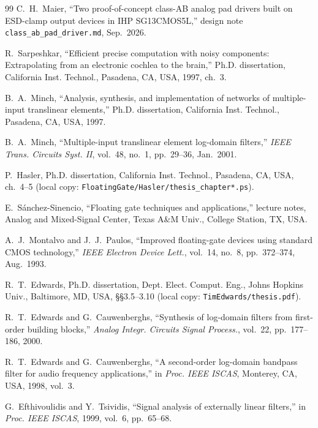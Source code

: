 \documentclass[journal]{IEEEtran}
\newcommand{\cell}[1]{\texttt{#1}}
\begin{document}
\begin{thebibliography}{99}
C.~H.~Maier, ``Two proof-of-concept class-AB analog pad drivers built on ESD-clamp output
devices in IHP SG13CMOS5L,'' design note \cell{class\_ab\_pad\_driver.md}, Sep.~2026.

R.~Sarpeshkar, ``Efficient precise computation with noisy components: Extrapolating from an
electronic cochlea to the brain,'' Ph.D. dissertation, California Inst. Technol., Pasadena,
CA, USA, 1997, ch.~3.

B.~A.~Minch, ``Analysis, synthesis, and implementation of networks of multiple-input
translinear elements,'' Ph.D. dissertation, California Inst. Technol., Pasadena, CA, USA,
1997.

B.~A.~Minch, ``Multiple-input translinear element log-domain filters,'' \emph{IEEE Trans.
Circuits Syst. II}, vol.~48, no.~1, pp.~29--36, Jan.~2001.

P.~Hasler, Ph.D. dissertation, California Inst. Technol., Pasadena, CA, USA, ch.~4--5
(local copy: \cell{FloatingGate/Hasler/thesis\_chapter*.ps}).

E.~S\'anchez-Sinencio, ``Floating gate techniques and applications,'' lecture notes, Analog
and Mixed-Signal Center, Texas A\&M Univ., College Station, TX, USA.

A.~J.~Montalvo and J.~J.~Paulos, ``Improved floating-gate devices using standard CMOS
technology,'' \emph{IEEE Electron Device Lett.}, vol.~14, no.~8, pp.~372--374, Aug.~1993.

R.~T.~Edwards, Ph.D. dissertation, Dept. Elect. Comput. Eng., Johns Hopkins Univ.,
Baltimore, MD, USA, \S\S3.5--3.10 (local copy: \cell{TimEdwards/thesis.pdf}).

R.~T.~Edwards and G.~Cauwenberghs, ``Synthesis of log-domain filters from first-order
building blocks,'' \emph{Analog Integr. Circuits Signal Process.}, vol.~22, pp.~177--186,
2000.

R.~T.~Edwards and G.~Cauwenberghs, ``A second-order log-domain bandpass filter for audio
frequency applications,'' in \emph{Proc. IEEE ISCAS}, Monterey, CA, USA, 1998, vol.~3.

G.~Efthivoulidis and Y.~Tsividis, ``Signal analysis of externally linear filters,'' in
\emph{Proc. IEEE ISCAS}, 1999, vol.~6, pp.~65--68.


\end{thebibliography}
\end{document}
